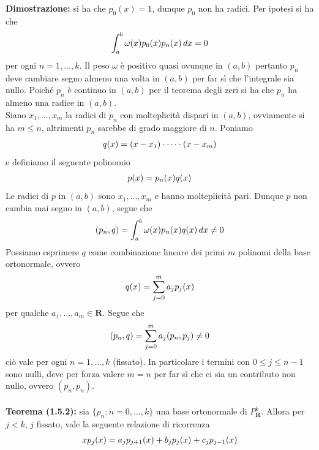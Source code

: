 \documentclass{article}
\begin{document}
\textbf{Dimostrazione:} si ha che $p_0(x) = 1$, dunque $p_0$ non ha radici. Per ipotesi si ha che
\begin{gather}
    \int_a^b \omega(x)p_0(x)p_n(x) \, dx = 0 \notag
\end{gather}
per ogni $n = 1, \dots, k$. Il peso $\omega$ è positivo quasi ovunque in $(a, b)$ pertanto $p_n$ deve cambiare segno almeno una volta in $(a, b)$ per far sì che l'integrale sia nullo. Poiché $p_n$ è continuo in $(a, b)$ per il teorema degli zeri si ha che $p_n$ ha almeno una radice in $(a, b)$. \\
Siano $x_1, \dots, x_m$ la radici di $p_n$ con molteplicità dispari in $(a, b)$, ovviamente si ha $m \leq n$, altrimenti $p_n$ sarebbe di grado maggiore di $n$. Poniamo
\begin{gather}
    q(x) = (x-x_1)\cdot \dots \cdot(x-x_m) \notag
\end{gather}
e definiamo il seguente polinomio
\begin{gather}
    p(x) = p_n(x)q(x) \notag
\end{gather}
Le radici di $p$ in $(a, b)$ sono $x_1, \dots, x_m$ e hanno molteplicità pari. Dunque $p$ non cambia mai segno in $(a, b)$, segue che
\begin{gather}
    (p_n, q) = \int_a^b \omega(x)p_n(x)q(x) \, dx \neq 0 \notag
\end{gather}
Possiamo esprimere $q$ come combinazione lineare dei primi $m$ polinomi della base ortonormale, ovvero
\begin{gather}
    q(x) = \sum_{j = 0}^m a_jp_j(x) \notag
\end{gather}
per qualche $a_1, \dots, a_m \in \mathbf{R}$. Segue che
\begin{gather}
    (p_n, q) = \sum_{j = 0}^m a_j(p_n, p_j) \neq 0 \notag
\end{gather}
ciò vale per ogni $n = 1, \dots, k$ (fissato). In particolare i termini con $0 \leq j \leq n-1$ sono nulli, deve per forza valere $m = n$ per far sì che ci sia un contributo non nullo, ovvero $(p_n, p_n)$. \\ \\
\textbf{Teorema (1.5.2):} sia $\{p_n : n = 0, \dots, k\}$ una base ortonormale di $P^k_\mathbf{R}$. Allora per $j < k$, $j$ fissato, vale la seguente relazione di ricorrenza
\begin{gather}
    xp_j(x) = a_jp_{j+1}(x) + b_jp_j(x) + c_jp_{j-1}(x) \notag
\end{gather}
\end{document}
